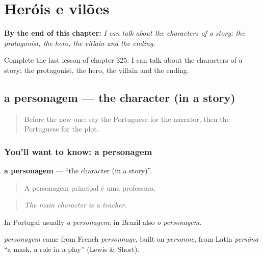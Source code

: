 
\chapter{Heróis e vilões}
\label{ch:pt-herois-e-viloes}

\begin{chapteropening}
\textbf{By the end of this chapter:} \emph{I can talk about the characters of a story: the protagonist, the hero, the villain and the ending.}

Complete the last lesson of chapter 325: I can talk about the characters of a story: the protagonist, the hero, the villain and the ending.
\end{chapteropening}

\section[a personagem]{a personagem — the character (in a story)}

\label{lesson:PT-C325-personagem}



\begin{quote}
Before the new one: say the Portuguese for the narrator, then the Portuguese for the plot.
\end{quote}

\subsection*{You'll want to know: a personagem}
\textbf{a personagem} — \textquotedblleft{}the character (in a story)\textquotedblright{}.

\begin{quote}
A personagem principal é uma professora.
\end{quote}

\begin{quote}
\emph{The main character is a teacher.}
\end{quote}

In Portugal usually \emph{a personagem}; in Brazil also \emph{o personagem}.

\begin{cousinweb}
\emph{personagem} came from French \emph{personnage}, built on \emph{personne}, from Latin \emph{persōna} \textquotedblleft{}a mask, a role in a play\textquotedblright{} (Lewis \& Short).
\end{cousinweb}

